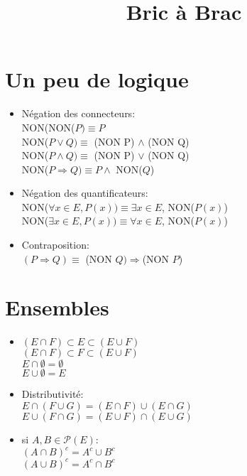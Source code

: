 \documentclass[fleqn]{article}
\title{Bric \`a Brac}
\date{}
\theoremstyle{definition} \newtheorem*{defi}{D\'efinition}
\theoremstyle{plain} \newtheorem*{theo}{Th\'eor\`eme}
\begin{document}
\maketitle

\section{Un peu de logique}
\begin{itemize}
	\item N\'egation des connecteurs: \\
		NON(NON(\(P) \equiv  P\) \\
		NON(\(P \lor Q) \equiv \) (NON P) \(\land\) (NON Q) \\
		NON(\(P \land Q) \equiv \) (NON P) \(\lor\) (NON Q) \\
		NON(\(P \Rightarrow Q) \equiv P \land\) NON(\(Q\))
	\item N\'egation des quantificateurs: \\
		NON(\(\forall x \in E, P(x)) \equiv \exists x \in E\), NON(\(P(x)\)) \\
		NON(\(\exists x \in E, P(x)) \equiv \forall x \in E\), NON(\(P(x)\))
	\item Contraposition: \\
		\((P \Rightarrow Q) \equiv\) (NON \(Q)\Rightarrow\)(NON \(P\))
\end{itemize}

\section{Ensembles}
\begin{itemize}
	\item $(E \cap F) \subset E \subset (E \cup F)$ \\
		$(E \cap F) \subset F \subset (E \cup F)$ \\
		$E \cap \emptyset = \emptyset$ \\
		$E \cup \emptyset = E$
	\item Distributivit\'e: \\
		\(E \cap(F \cup G) = (E \cap F) \cup (E \cap G)\) \\
		\(E \cup (F \cap G) = (E \cup F) \cap (E \cup G)\)
	\item si \(A, B \in \mathcal{P}(E)\): \\
		\((A \cap B)^c = A^c \cup B^c\) \\
		\((A \cup B)^c = A^c \cap B^c\)
\end{itemize}
\end{document}
